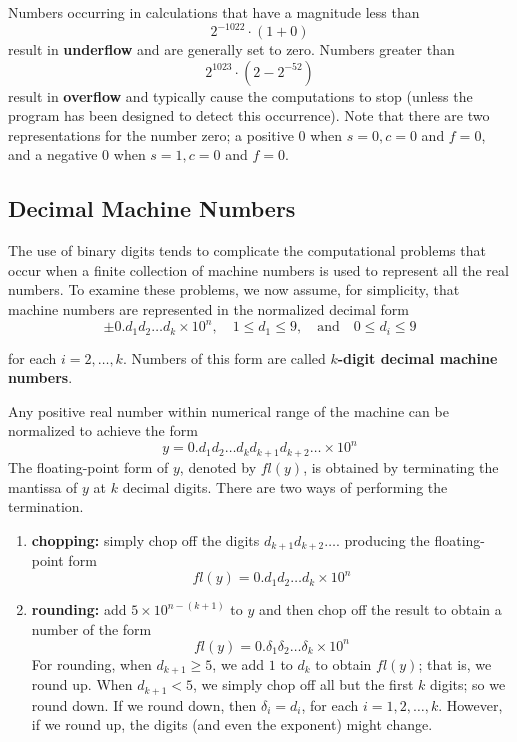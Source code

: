Numbers occurring in calculations that have a magnitude less than 
\[2^{-1022}\cdot(1+0)\]
result in {\bf underflow} and are generally set to zero. Numbers greater than
\[2^{1023}\cdot(2-2^{-52})\]
result in {\bf overflow} and typically cause the computations to stop (unless the program has been designed to detect this occurrence). Note that there are two representations for the number zero; a positive $0$ when $s=0, c=0$ and $f=0$, and a negative $0$ when $s=1, c=0$ and $f=0$.

\subsection*{Decimal Machine Numbers}
The use of binary digits tends to complicate the computational problems that occur when a finite collection of machine numbers is used to represent all the real numbers. To examine these problems, we now assume, for simplicity, that machine numbers are represented in the normalized decimal form
\[\pm 0 . d_{1} d_{2} \ldots d_{k} \times 10^{n}, \quad 1 \leq d_{1} \leq 9, \quad \mbox{and}\quad 0 \leq d_{i} \leq 9\]

for each $i=2, \ldots, k$. Numbers of this form are called {\bf $k$-digit decimal machine numbers}.

Any positive real number within numerical range of the machine can be normalized to achieve the form
\[y=0 . d_{1} d_{2} \ldots d_{k} d_{k+1} d_{k+2} \ldots \times 10^{n}\]
The floating-point form of $y$, denoted by $f l(y)$, is obtained by terminating the mantissa of $y$ at $k$ decimal digits. There are two ways of performing the termination. 
\begin{enumerate}[label=\arabic*.]
\item {\bf chopping:} simply chop off the digits $d_{k+1} d_{k+2} \ldots$.  producing the floating-point form
\[f l(y)=0 . d_{1} d_{2} \ldots d_{k} \times 10^{n}\]
\item {\bf rounding:} add $5\times10^{n−(k+1)}$ to $y$ and then chop off the result to obtain a number of the form
\[f l(y)=0 .\delta_{1} \delta_{2} \ldots \delta_{k} \times 10^{n}\]
For rounding, when $d_{k+1}\geq5$, we add $1$ to $d_k$ to obtain $fl(y)$; that is, we round up. When $d_{k+1} < 5$, we simply chop off all but the first $k$ digits; so we round down. If we round down, then $\delta_i = d_i$, for each $i = 1, 2, \ldots, k$. However, if we round up, the digits (and even the exponent) might change.
\end{enumerate}

